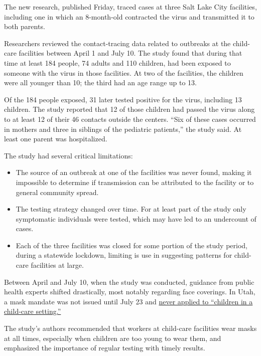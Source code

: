 The new research, published Friday, traced cases at three Salt Lake City
facilities, including one in which an 8-month-old contracted the virus
and transmitted it to both parents.

Researchers reviewed the contact-tracing data related to outbreaks at
the child-care facilities between April 1 and July 10. The study found
that during that time at least 184 people, 74 adults and 110 children,
had been exposed to someone with the virus in those facilities. At two
of the facilities, the children were all younger than 10; the third had
an age range up to 13.

Of the 184 people exposed, 31 later tested positive for the virus,
including 13 children. The study reported that 12 of those children had
passed the virus along to at least 12 of their 46 contacts outside the
centers. ``Six of these cases occurred in mothers and three in siblings
of the pediatric patients,'' the study said. At least one parent was
hospitalized.

The study had several critical limitations:

\begin{itemize}
\tightlist
\item
  The source of an outbreak at one of the facilities was never found,
  making it impossible to determine if transmission can be attributed to
  the facility or to general community spread.
\end{itemize}

\begin{itemize}
\item
  The testing strategy changed over time. For at least part of the study
  only symptomatic individuals were tested, which may have led to an
  undercount of cases.
\item
  Each of the three facilities was closed for some portion of the study
  period, during a statewide lockdown, limiting is use in suggesting
  patterns for child-care facilities at large.
\end{itemize}

Between April and July 10, when the study was conducted, guidance from
public health experts shifted drastically, most notably regarding face
coverings. In Utah, a mask mandate was not issued until July 23 and
\href{https://governor.utah.gov/wp-content/uploads/sites/40/2020/07/EO-2020-45-Extending-Face-Coverings-Requirement-in-State-Facilities.pdf}{never
applied to ``children in a child-care setting.''}

The study's authors recommended that workers at child-care facilities
wear masks at all times, especially when children are too young to wear
them, and emphasized the importance of regular testing with timely
results.


